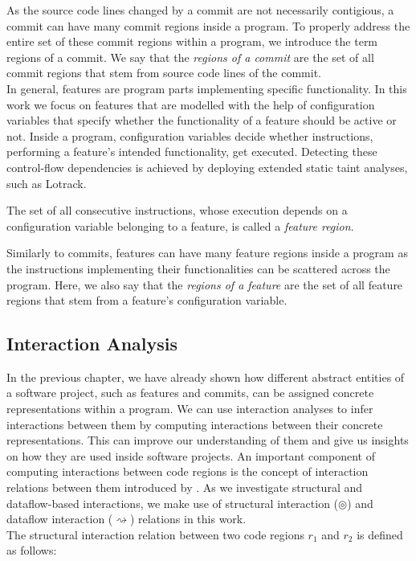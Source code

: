 As the source code lines changed by a commit are not necessarily contigious,
a commit can have many commit regions inside a program. 
To properly address the entire set of these commit regions within a program, we introduce the term regions of a commit.
We say that the \emph{regions of a commit} are the set of all commit regions that stem from source code lines of the commit. \\

In general, features are program parts implementing specific functionality.
In this work we focus on features that are modelled with the help of configuration variables that specify whether the functionality of a feature should be active or not.
Inside a program, configuration variables decide whether instructions, performing a feature's intended functionality, get executed. 
Detecting these control-flow dependencies is achieved by deploying extended static taint analyses, such as Lotrack\cite{lillack2014tracking}.

\begin{definition}\label{def:feature_regions}
	The set of all consecutive instructions, whose execution depends on a configuration variable belonging to a feature, is called a \emph{feature region}. 
\end{definition}

Similarly to commits, features can have many feature regions inside a program
as the instructions implementing their functionalities can be scattered across the program.
Here, we also say that the \emph{regions of a feature} are the set of all feature regions that stem from a feature's configuration variable. 

\subsection{Interaction Analysis}\label{sec:interaction_analysis}

In the previous chapter, we have already shown how different abstract entities of a software project, such as features and commits, can be assigned concrete representations within a program.
We can use interaction analyses to infer interactions between them by computing interactions between their concrete representations.
This can improve our understanding of them and give us insights on how they are used inside software projects. 
An important component of computing interactions between code regions is the concept of interaction relations between them introduced by \citet{sattler2023thesis}.
As we investigate structural and dataflow-based interactions, we make use of structural interaction ($\circledcirc$) and dataflow interaction ($\rightsquigarrow$) relations in this work. \\
The structural interaction relation between two code regions $r_1$ and $r_2$ is defined as follows:

